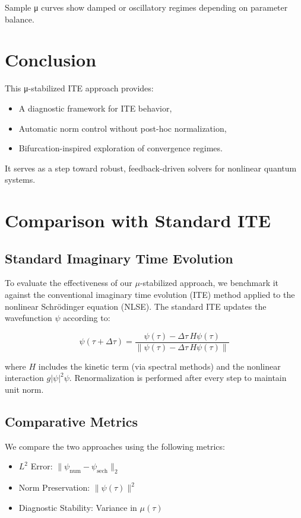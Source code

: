 \documentclass[11pt]{article}
\begin{document}
Sample μ curves show damped or oscillatory regimes depending on parameter balance.

\section{Conclusion}

This μ-stabilized ITE approach provides:
\begin{itemize}
  \item A diagnostic framework for ITE behavior,
  \item Automatic norm control without post-hoc normalization,
  \item Bifurcation-inspired exploration of convergence regimes.
\end{itemize}

It serves as a step toward robust, feedback-driven solvers for nonlinear quantum systems.

\section{Comparison with Standard ITE}

\subsection{Standard Imaginary Time Evolution}
To evaluate the effectiveness of our $\mu$-stabilized approach, we benchmark it against the conventional imaginary time evolution (ITE) method applied to the nonlinear Schrödinger equation (NLSE). The standard ITE updates the wavefunction $\psi$ according to:

\[
\psi(\tau + \Delta\tau) = \frac{\psi(\tau) - \Delta\tau \, H\psi(\tau)}{\|\psi(\tau) - \Delta\tau \, H\psi(\tau)\|}
\]

where $H$ includes the kinetic term (via spectral methods) and the nonlinear interaction $g|\psi|^2\psi$. Renormalization is performed after every step to maintain unit norm.

\subsection{Comparative Metrics}
We compare the two approaches using the following metrics:
\begin{itemize}
    \item $L^2$ Error: $\|\psi_{\text{num}} - \psi_{\text{sech}}\|_2$
    \item Norm Preservation: $\|\psi(\tau)\|^2$
    \item Diagnostic Stability: Variance in $\mu(\tau)$
\end{itemize}
\end{document}
